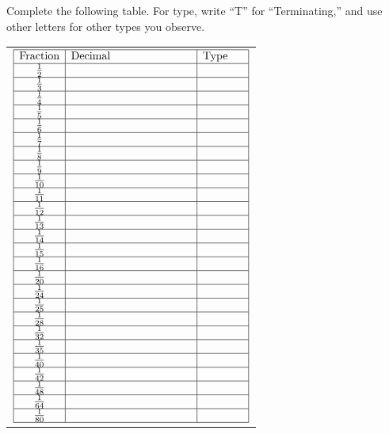 \documentclass{ximera}
\begin{document}
\begin{problem}\label{AR:exp} 
Complete the following table.  For type, write ``T'' for ``Terminating,'' and use other letters for other types you observe.  


\renewcommand{\arraystretch}{2}
\begin{tabular}{l}
$\begin{array}{|c|p{1.5in}|p{0.5in}|}
\hline
\text{Fraction} & Decimal & Type \\ \hline
\frac{1}{2} & &  \\  \hline
\frac{1}{3} & &  \\   \hline
\frac{1}{4} & &  \\   \hline
\frac{1}{5} & &  \\   \hline
\frac{1}{6} & &  \\   \hline
\frac{1}{7} & &  \\   \hline
\frac{1}{8} & &  \\   \hline
\frac{1}{9} & &  \\   \hline
\frac{1}{10} & &  \\   \hline
\frac{1}{11} & &  \\   \hline
\frac{1}{12} & &  \\   \hline
\frac{1}{13} & &  \\  \hline
\frac{1}{14} & &  \\  \hline
\frac{1}{15} & &  \\  \hline
\frac{1}{16} & &  \\   \hline
\frac{1}{20} & &  \\   \hline
\frac{1}{24} & &  \\   \hline
\frac{1}{25} & &  \\   \hline
\frac{1}{28} & &  \\   \hline
\frac{1}{32} & &  \\   \hline
\frac{1}{35} & &  \\   \hline
\frac{1}{40} & &  \\   \hline
\frac{1}{42} & &  \\   \hline
\frac{1}{48} & &  \\   \hline
\frac{1}{64} & &  \\   \hline
\frac{1}{80} & &  \\   \hline
\end{array}$
\end{tabular}



\end{problem}
\end{document}
